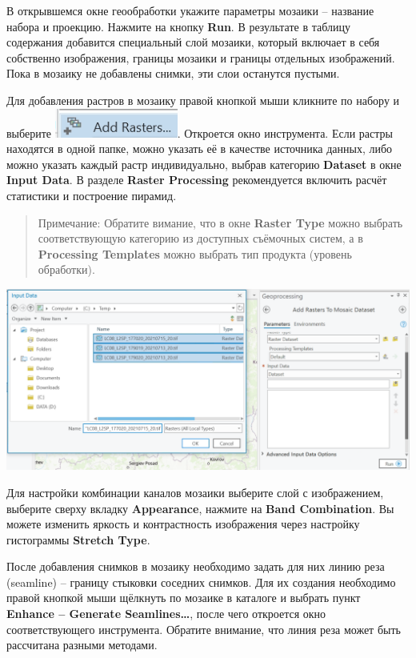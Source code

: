 \documentclass[
  12pt,
]{book}
\begin{document}
В открывшемся окне геообработки укажите параметры мозаики -- название набора и проекцию. Нажмите на кнопку \textbf{Run}. В результате в таблицу содержания добавится специальный слой мозаики, который включает в себя собственно изображения, границы мозаики и границы отдельных изображений. Пока в мозаику не добавлены снимки, эти слои останутся пустыми.

Для добавления растров в мозаику правой кнопкой мыши кликните по набору и выберите \includegraphics{images/Ref03/Add_Rasters.png}. Откроется окно инструмента. Если растры находятся в одной папке, можно указать её в качестве источника данных, либо можно указать каждый растр индивидуально, выбрав категорию \textbf{Dataset} в окне \textbf{Input Data}. В разделе \textbf{Raster Processing} рекомендуется включить расчёт статистики и построение пирамид.

\begin{quote}
Примечание: Обратите вимание, что в окне \textbf{Raster Type} можно выбрать соответствующую категорию из доступных съёмочных систем, а в \textbf{Processing Templates} можно выбрать тип продукта (уровень обработки).
\end{quote}

\includegraphics{images/Ref03/Raster_Dataset.png}

Для настройки комбинации каналов мозаики выберите слой с изображением, выберите сверху вкладку \textbf{Appearance}, нажмите на \textbf{Band Combination}. Вы можете изменить яркость и контрастность изображения через настройку гистограммы \textbf{Stretch Type}.

После добавления снимков в мозаику необходимо задать для них линию реза (seamline) -- границу стыковки соседних снимков. Для их создания необходимо правой кнопкой мыши щёлкнуть по мозаике в каталоге и выбрать пункт \textbf{Enhance -- Generate Seamlines\ldots{}}, после чего откроется окно соответствующего инструмента. Обратите внимание, что линия реза может быть рассчитана разными методами.
\end{document}

